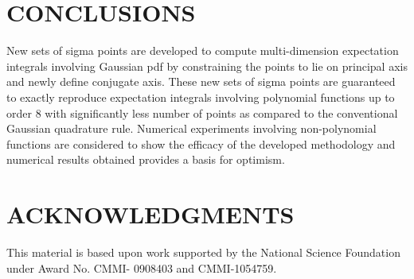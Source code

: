 \documentclass[letterpaper, 10 pt, conference]{IEEEtran}  %
\newcommand{\comments}[1]{}
\begin{document}
\section{CONCLUSIONS}
 New sets of sigma points are developed to compute multi-dimension expectation integrals involving Gaussian pdf by constraining the points to lie on principal axis and newly define conjugate axis. These new sets of sigma points are guaranteed to exactly reproduce expectation integrals involving polynomial functions up to order 8 with significantly less number of points as compared to the conventional Gaussian quadrature rule. Numerical experiments involving non-polynomial functions are considered to show the efficacy of the developed methodology and numerical results obtained provides a basis for optimism.
 
 
 
\section{ACKNOWLEDGMENTS}
This material is based upon work supported by the National Science Foundation under Award
No. CMMI- 0908403 and CMMI-1054759.




\end{document}
